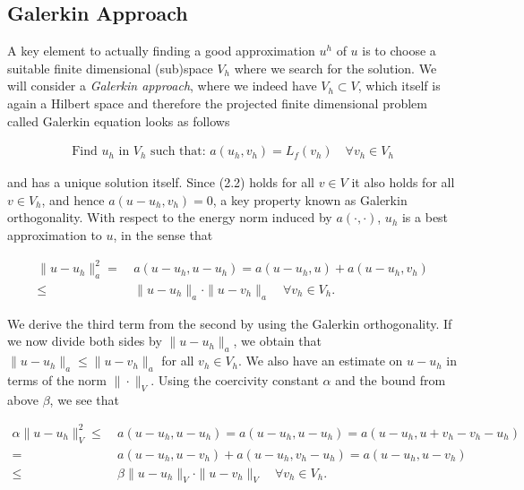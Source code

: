 \documentclass[../draft_1.tex]{subfiles}
\begin{document}
\subsection{Galerkin Approach}
A key element to actually finding a good approximation $u^h$ of $u$ is to choose a suitable finite dimensional (sub)space $V_h$ where we search for the solution. We will consider a \textit{Galerkin approach}, where we indeed have $V_h \subset V$, which itself is again a Hilbert space and therefore the projected finite dimensional problem called Galerkin equation looks as follows
\begin{ceqn}
\begin{equation}
\begin{aligned}
\text{Find } u_h \text{ in } V_h \text{ such that:  } a(u_h, v_h) = L_f(v_h) \quad \forall v_h \in V_h
\end{aligned}
\end{equation}
\end{ceqn}
and has a unique solution itself. Since (2.2) holds for all $v \in V$ it also holds for all $v \in V_h$, and hence $a(u-u_h, v_h) = 0$, a key property known as Galerkin orthogonality. With respect to the energy norm induced by $a(\cdot, \cdot)$, $u_h$ is a best approximation to $u$, in the sense that 
\begin{ceqn}
\begin{equation}
\begin{aligned}
\| u - u_h \|_a^2 =& \ a(u-u_h, u-u_h) = a(u-u_h, u) + a(u-u_h, v_h) \\
\leq& \ \|u - u_h \|_a \cdot \| u - v_h \|_a \quad \forall v_h \in V_h.
\end{aligned}
\end{equation}
\end{ceqn}
We derive the third term from the second by using the Galerkin orthogonality. If we now divide both sides by $\| u - u_h\|_a$, we obtain that $\| u - u_h \|_a \leq \| u -v_h\|_a$ for all $v_h \in V_h$. We also have an estimate on $u - u_h$ in terms of the  norm $\| \cdot \|_V$. Using the coercivity constant $\alpha$ and the bound from above $\beta$, we see that
\begin{ceqn}
\begin{equation}
\begin{aligned}
\alpha \| u - u_h \|_V^2 \leq& \ a(u-u_h, u-u_h) = a(u-u_h, u- u_h) = a(u-u_h, u +v_h - v_h - u_h ) \\
=& \ a(u-u_h, u - v_h) + a(u - u_h, v_h - u_h) = a(u-u_h, u - v_h) \\
\leq& \ \beta \| u - u_h \|_V \cdot \| u - v_h\|_V  \quad \forall v_h \in V_h.
\end{aligned}
\end{equation}
\end{ceqn}
\end{document}
